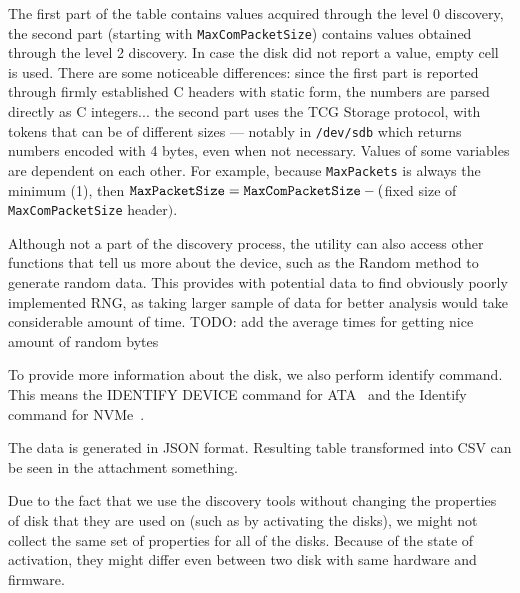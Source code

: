 The first part of the table contains values acquired through the level 0 discovery, the second part (starting with \verb|MaxComPacketSize|) contains values obtained through the level 2 discovery. In case the disk did not report a value, empty cell is used.
There are some noticeable differences: since the first part is reported through firmly established C headers with static form, the numbers are parsed directly as C integers... the second part uses the TCG Storage protocol, with tokens that can be of different sizes --- notably in \verb|/dev/sdb| which returns numbers encoded with 4 bytes, even when not necessary.
Values of some variables are dependent on each other. For example, because \verb|MaxPackets| is always the minimum (1), then $\verb|MaxPacketSize| = \verb|MaxComPacketSize| - ($fixed size of \verb|MaxComPacketSize| header$)$.

Although not a part of the discovery process, the utility can also access other functions that tell us more about the device, such as the Random method to generate random data. This provides with potential data to find obviously poorly implemented RNG, as taking larger sample of data for better analysis would take considerable amount of time. TODO: add the average times for getting nice amount of random bytes

To provide more information about the disk, we also perform identify command. This means the IDENTIFY DEVICE command for ATA~\cite{acs-3} and the Identify command for NVMe~\cite{nvme-express-base-specification}.

The data is generated in JSON format. Resulting table transformed into CSV can be seen in the attachment something.

Due to the fact that we use the discovery tools without changing the properties of disk that they are used on (such as by activating the disks), we might not collect the same set of properties for all of the disks. Because of the state of activation, they might differ even between two disk with same hardware and firmware.

